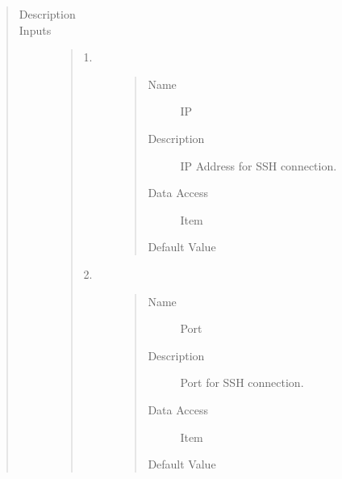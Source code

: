 \documentclass[letterpaper,10pt,english]{sphinxmanual}
\begin{document}
\begin{quote}\begin{description}
\item[{Description}] \leavevmode
{}

\item[{Inputs}] \leavevmode\begin{quote}\begin{description}
\item[{1.}] \leavevmode\begin{quote}\begin{description}
\item[{Name}] \leavevmode
IP

\item[{Description}] \leavevmode
IP Address for SSH connection.

\item[{Data Access}] \leavevmode
Item

\item[{Default Value}] \leavevmode
{}

\end{description}\end{quote}

\item[{2.}] \leavevmode\begin{quote}\begin{description}
\item[{Name}] \leavevmode
Port

\item[{Description}] \leavevmode
Port for SSH connection.

\item[{Data Access}] \leavevmode
Item

\item[{Default Value}] \leavevmode
{}

\end{description}\end{quote}


\end{description}
\end{quote}
\end{description}
\end{quote}
\end{document}
